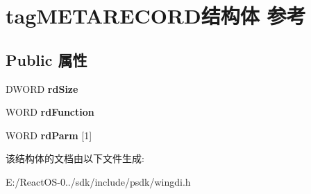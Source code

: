 \hypertarget{structtag_m_e_t_a_r_e_c_o_r_d}{}\section{tag\+M\+E\+T\+A\+R\+E\+C\+O\+R\+D结构体 参考}
\label{structtag_m_e_t_a_r_e_c_o_r_d}
\subsection*{Public 属性}
\begin{DoxyCompactItemize}
\item 
\mbox{\label{structtag_m_e_t_a_r_e_c_o_r_d_a17139451760ce5518552fa1267bf2fdd}} 
D\+W\+O\+RD {\bfseries rd\+Size}
\item 
\mbox{\label{structtag_m_e_t_a_r_e_c_o_r_d_ad1c0a49ea07f05c56383cf6ce5ca9735}} 
W\+O\+RD {\bfseries rd\+Function}
\item 
\mbox{\label{structtag_m_e_t_a_r_e_c_o_r_d_a68f7298ff3941968c98d13afb3eb3d5d}} 
W\+O\+RD {\bfseries rd\+Parm} \mbox{[}1\mbox{]}
\end{DoxyCompactItemize}


该结构体的文档由以下文件生成\+:\begin{DoxyCompactItemize}
\item 
E\+:/\+React\+O\+S-\/0../sdk/include/psdk/wingdi.\+h\end{DoxyCompactItemize}
